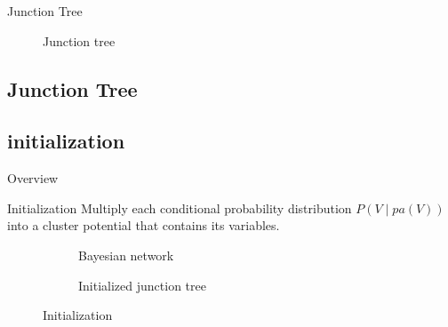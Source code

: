\documentclass[10pt,usenames,dvipsnames]{beamer}
\begin{document}


\begin{frame}{Junction Tree}
    \begin{figure}
        \scalebox{0.9}{}
        \caption{Junction tree}
    \end{figure}
\end{frame}

\subsection{Junction Tree}

\subsection{initialization}

\begin{frame}{Overview}
  \begin{figure}
    \vspace{0.6cm} %
  \end{figure}
\end{frame}

\begin{frame}{Initialization}
  \centering
  {\footnotesize
    Multiply each conditional probability distribution $P(V \mid pa(V))$\\
    into a cluster potential that contains its variables.
  }
  \begin{figure}
    \begin{subfigure}[b]{0.41\textwidth}
      \centering
      \scalebox{0.8}{}
      \caption{Bayesian network}
    \end{subfigure}
    \begin{subfigure}[b]{0.58\textwidth}
      \centering
      \resizebox{\textwidth}{!}{}
      \caption{Initialized junction tree}
    \end{subfigure}
    \caption{Initialization}
  \end{figure}
\end{frame}
\end{document}
